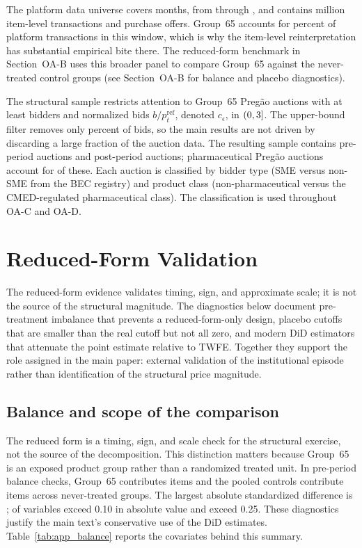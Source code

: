 \documentclass[12pt]{article}
\begin{document}
The platform data universe covers \nDataMonths{} months, from
\windowStart{} through \windowEnd, and contains \itemTransactionsCount{}
million item-level transactions and \purchaseOffersCount{} purchase
offers. Group~65 accounts for \groupSixtyfivePctTx{} percent of platform
transactions in this window, which is why the item-level reinterpretation
has substantial empirical bite there. The reduced-form benchmark in
Section~OA-B uses this broader panel to compare Group~65 against the
never-treated control groups (see Section~OA-B for balance and placebo
diagnostics).

The structural sample restricts attention to Group~65 Preg\~ao auctions
with at least \filterMinBidders{} bidders and normalized bids
$b/p_t^{\mathrm{ref}}$, denoted $c_\epsilon$, in $(0,3]$.
The upper-bound filter removes only \nFilteredOutPct{} percent of bids, so
the main results are not driven by discarding a large fraction of the
auction data. The resulting sample contains \nPreAuctions{} pre-period
auctions and \nPostAuctions{} post-period auctions; pharmaceutical
Preg\~ao auctions account for \nPharmaPregaoAuc{} of these. Each auction
is classified by bidder type (SME versus non-SME from the BEC registry)
and product class (non-pharmaceutical versus the CMED-regulated
pharmaceutical class). The classification is used throughout OA-C and
OA-D.

\section{Reduced-Form Validation}

The reduced-form evidence validates timing, sign, and approximate scale;
it is not the source of the structural magnitude. The diagnostics below
document pre-treatment imbalance that prevents a reduced-form-only
design, placebo cutoffs that are smaller than the real cutoff but not all
zero, and modern DiD estimators that attenuate the point estimate
relative to TWFE. Together they support the role assigned in the main
paper: external validation of the institutional episode rather than
identification of the structural price magnitude.

\subsection{Balance and scope of the comparison}

The reduced form is a timing, sign, and scale check for the structural
exercise, not the source of the decomposition. This distinction matters because
Group~65 is an exposed product group rather than a randomized treated unit. In
pre-period balance checks, Group~65 contributes \balanceNGsixfiveItems{} items
and the pooled controls contribute \balanceNCtrlItems{} items across
\balanceNCtrlGroups{} never-treated groups. The largest absolute standardized
difference is \balanceMaxStdDiff; \balanceNVarsAboveTen{} of
\balanceNVarsTotal{} variables exceed 0.10 in absolute value and
\balanceNVarsAboveTwentyFive{} exceed 0.25. These diagnostics justify the main
text's conservative use of the DiD estimates. Table~\ref{tab:app_balance}
reports the covariates behind this summary.
\end{document}
